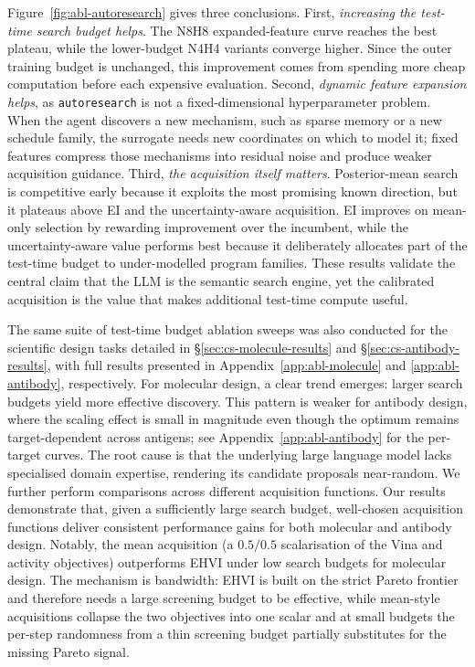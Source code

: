 Figure~\ref{fig:abl-autoresearch} gives three conclusions. First, \emph{increasing the test-time search budget helps}. The \textsc{N8H8} expanded-feature curve reaches the best plateau, while the lower-budget \textsc{N4H4} variants converge higher. Since the outer training budget is unchanged, this improvement comes from spending more cheap computation before each expensive evaluation. Second, \emph{dynamic feature expansion helps}, as \texttt{autoresearch} is not a fixed-dimensional hyperparameter problem. When the agent discovers a new mechanism, such as sparse memory or a new schedule family, the surrogate needs new coordinates on which to model it; fixed features compress those mechanisms into residual noise and produce weaker acquisition guidance. Third, \emph{the acquisition itself matters}. Posterior-mean search is competitive early because it exploits the most promising known direction, but it plateaus above EI and the uncertainty-aware acquisition. EI improves on mean-only selection by rewarding improvement over the incumbent, while the uncertainty-aware value performs best because it deliberately allocates part of the test-time budget to under-modelled program families. These results validate the central claim that the LLM is the semantic search engine, yet the calibrated acquisition is the value that makes additional test-time compute useful.

The same suite of test-time budget ablation sweeps was also conducted for the scientific design tasks detailed in \S\ref{sec:cs-molecule-results} and \S\ref{sec:cs-antibody-results}, with full results presented in Appendix~\ref{app:abl-molecule} and \ref{app:abl-antibody}, respectively. For molecular design, a clear trend emerges: larger search budgets yield more effective discovery. This pattern is weaker for antibody design, where the scaling effect is small in magnitude even though the optimum remains target-dependent across antigens; see Appendix~\ref{app:abl-antibody} for the per-target curves. The root cause is that the underlying large language model lacks specialised domain expertise, rendering its candidate proposals near-random. We further perform comparisons across different acquisition functions. Our results demonstrate that, given a sufficiently large search budget, well-chosen acquisition functions deliver consistent performance gains for both molecular and antibody design. Notably, the mean acquisition (a $0.5/0.5$ scalarisation of the Vina and activity objectives) outperforms EHVI under low search budgets for molecular design. The mechanism is bandwidth: EHVI is built on the strict Pareto frontier and therefore needs a large screening budget to be effective, while mean-style acquisitions collapse the two objectives into one scalar and at small budgets the per-step randomness from a thin screening budget partially substitutes for the missing Pareto signal.

